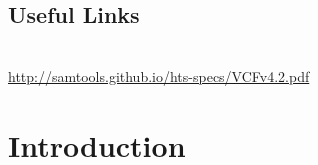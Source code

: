 
\subsection{Useful Links}

\begin{description}[style=multiline,labelindent=0cm,align=left,leftmargin=1cm]
 \item[Variant Call Format (VCF) specification] \hfill\\
  \url{http://samtools.github.io/hts-specs/VCFv4.2.pdf}
\end{description}

\newpage


\section{Introduction}

